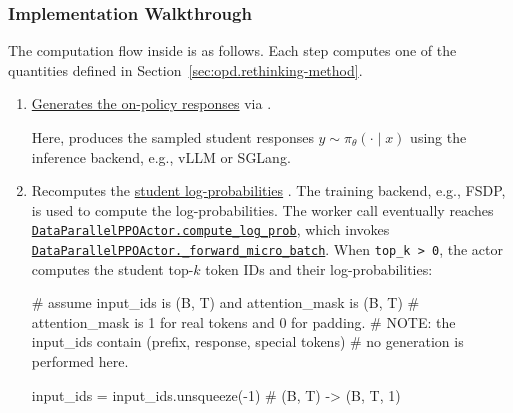 \subsubsection{Implementation Walkthrough}
\label{sec:opd.rethinking-impl}

The computation flow inside  is as follows. Each step computes one
of the quantities defined in Section~\ref{sec:opd.rethinking-method}.
\begin{enumerate}

    \item  
    \href{https://github.com/Thinking-Space/Rethinking-OPD/blob/ac26e38d6f1572eb027597b48a9f4e01f6915ef8/verl/verl/trainer/ppo/ray_trainer.py#L1051}
    {Generates the on-policy responses} via
    \newline
    .

    Here,  produces the sampled student responses
    $y \sim \pi_\theta(\cdot\mid x)$ using the inference backend, e.g., vLLM or SGLang.

    \item Recomputes the \href{https://github.com/Thinking-Space/Rethinking-OPD/blob/ac26e38d6f1572eb027597b48a9f4e01f6915ef8/verl/verl/trainer/ppo/ray_trainer.py#L1111}{student log-probabilities} .
    The training backend, e.g., FSDP, is used to compute the log-probabilities.
    The worker call eventually reaches
    \href{https://github.com/Thinking-Space/Rethinking-OPD/blob/ac26e38d6f1572eb027597b48a9f4e01f6915ef8/verl/verl/workers/actor/dp_actor.py#L648}
    {\texttt{DataParallelPPOActor.compute\_log\_prob}}, which invokes
    \newline
    \href{https://github.com/Thinking-Space/Rethinking-OPD/blob/ac26e38d6f1572eb027597b48a9f4e01f6915ef8/verl/verl/workers/actor/dp_actor.py#L86}{\texttt{DataParallelPPOActor.\_forward\_micro\_batch}}. When \texttt{top\_k > 0}, the actor
    computes the student top-$k$ token IDs and their log-probabilities:
    \begin{codeblock}[language=Python]
# assume input_ids is (B, T) and attention_mask is (B, T)
# attention_mask is 1 for real tokens and 0 for padding.
# NOTE: the input_ids contain (prefix, response, special tokens)
# no generation is performed here.

input_ids = input_ids.unsqueeze(-1) # (B, T) -> (B, T, 1)


\end{codeblock}
\end{enumerate}
